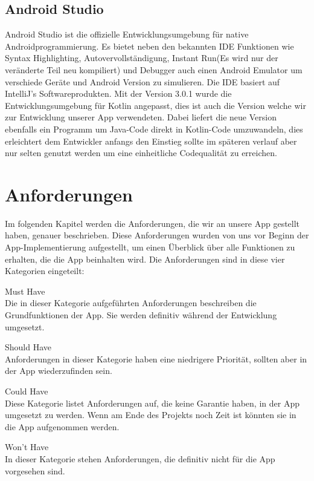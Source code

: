 \subsection{Android Studio}

Android Studio ist die offizielle Entwicklungsumgebung für native Androidprogrammierung. Es bietet neben den bekannten IDE Funktionen wie Syntax Highlighting, Autovervollständigung, Instant Run(Es wird nur der veränderte Teil neu kompiliert) und Debugger auch einen Android Emulator um verschiede Geräte und Android Version zu simulieren. Die IDE basiert auf IntelliJ's Softwareprodukten. Mit der Version 3.0.1 wurde die Entwicklungsumgebung für Kotlin angepasst, dies ist auch die Version welche wir zur Entwicklung unserer App verwendeten. Dabei liefert die neue Version ebenfalls ein Programm um Java-Code direkt in Kotlin-Code umzuwandeln, dies erleichtert dem Entwickler anfangs den Einstieg sollte im späteren verlauf aber nur selten genutzt werden um eine einheitliche Codequalität zu erreichen.

\newpage
\section{Anforderungen}
Im folgenden Kapitel werden die Anforderungen, die wir an unsere App gestellt haben, genauer beschrieben. Diese Anforderungen wurden von uns vor Beginn der App-Implementierung aufgestellt, um einen Überblick über alle Funktionen zu erhalten, die die App beinhalten wird. Die Anforderungen sind in diese vier Kategorien eingeteilt:
\begin{description}
\item Must Have \\
Die in dieser Kategorie aufgeführten Anforderungen beschreiben die Grundfunktionen der App. Sie werden definitiv während der Entwicklung umgesetzt.
\item Should Have \\
Anforderungen in dieser Kategorie haben eine niedrigere Priorität, sollten aber in der App wiederzufinden sein.
\item Could Have \\
Diese Kategorie listet Anforderungen auf, die keine Garantie haben, in der App umgesetzt zu werden. Wenn am Ende des Projekts noch Zeit ist könnten sie in die App aufgenommen werden.
\item Won't Have \\
In dieser Kategorie stehen Anforderungen, die definitiv nicht für die App vorgesehen sind.
\end{description}

